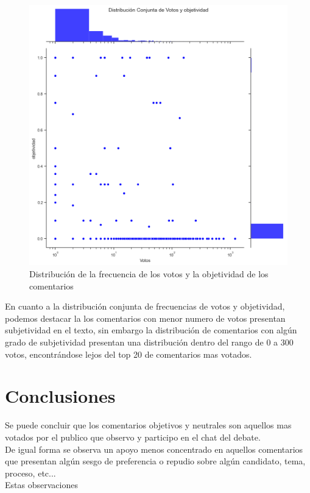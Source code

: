 \begin{figure}[!h]
	\centering
	\includegraphics[width=16cm]{../Datos/DisVotosObjetividad}
	\caption[Distribución de frecuencia de voto y objetividad]{Distribución de la frecuencia de los votos y la objetividad de los comentarios}
	\label{fig:dvo}
\end{figure}

En cuanto a la distribución conjunta de frecuencias de votos y objetividad, podemos destacar la los comentarios con menor numero de votos presentan subjetividad en el texto, sin embargo la distribución de comentarios con algún grado de subjetividad presentan una distribución dentro del rango de 0 a 300 votos, encontrándose lejos del top 20 de comentarios mas votados. 

\chapter{Conclusiones}

Se puede concluir que los comentarios objetivos y neutrales son aquellos mas votados por el publico que observo y participo en el chat del debate.\\ 

De igual forma se observa un apoyo menos concentrado en aquellos comentarios que presentan algún sesgo de preferencia o repudio sobre algún candidato, tema, proceso, etc...\\

Estas observaciones 
